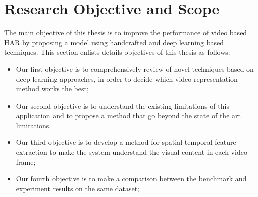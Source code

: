 \section{Research Objective and Scope}
\hspace{5mm} The main objective of this thesis is to improve the performance of video based HAR by proposing a model using handcrafted and deep learning based techniques. This section enlists details objectives of this thesis as follows:
\begin{itemize}
    \item Our first objective is to comprehensively review of novel techniques based on deep learning approaches, in order to decide which video representation method works the best;
    \item Our second objective is to understand the existing limitations of this application and to propose a method that go beyond the state of the art limitations.
    \item Our third objective is to develop a method for spatial temporal feature extraction to make the system understand the visual content in each video frame;
    \item Our fourth objective is to make a comparison between the benchmark and experiment results on the same dataset;
\end{itemize}

